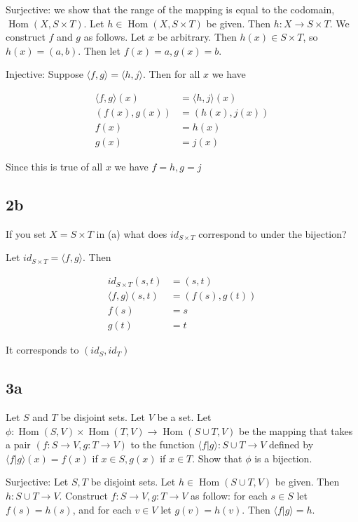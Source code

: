 \documentclass{article}
\DeclareMathOperator{\Hom}{Hom}
\newcommand{\<}{\langle}
\renewcommand{\>}{\rangle}
\begin{document}
Surjective: we show that the range of the mapping is equal to the codomain, $\Hom(X, S \times T)$. Let $h \in \Hom(X, S \times T)$ be given. Then $h: X \to S \times T$. We construct $f$ and $g$ as follows. Let $x$ be arbitrary. Then $h(x) \in S \times T$, so $h(x) = (a, b)$. Then let $f(x) = a, g(x) = b$.

Injective: Suppose $\<f, g\> = \<h, j\>$. Then for all $x$ we have

\begin{align*}
\<f, g\>(x) &= \<h, j\>(x) \\
(f(x), g(x)) &= (h(x), j(x)) \\
f(x) &= h(x) \\
g(x) &= j(x)
\end{align*}

Since this is true of all $x$ we have $f = h, g = j$

\subsection*{2b}

If you set $X = S \times T$ in (a) what does $id_{S \times T}$ correspond to under the bijection?

Let $id_{S \times T} = \<f, g\>$. Then

\begin{align*}
id_{S \times T}(s, t) &= (s, t) \\
\<f, g\>(s, t) &= (f(s), g(t)) \\
f(s) &= s \\
g(t) &= t
\end{align*}

It corresponds to $(id_S, id_T)$

\subsection*{3a}

Let $S$ and $T$ be disjoint sets. Let $V$ be a set. Let $\phi: \Hom(S, V) \times \Hom(T, V) \to \Hom(S \cup T, V)$ be the mapping that takes a pair $(f: S \to V, g: T \to V)$ to the function $\<f|g\>: S \cup T \to V$ defined by $\<f|g\>(x) = f(x)$ if $x \in S, g(x)$ if $x \in T$. Show that $\phi$ is a bijection.

Surjective: Let $S, T$ be disjoint sets. Let $h \in \Hom(S \cup T, V)$ be given. Then $h: S \cup T \to V$. Construct $f: S \to V, g: T \to V$ as follow: for each $s \in S$ let $f(s) = h(s)$, and for each $v \in V$ let $g(v) = h(v)$. Then $\<f|g\> = h$.
\end{document}
